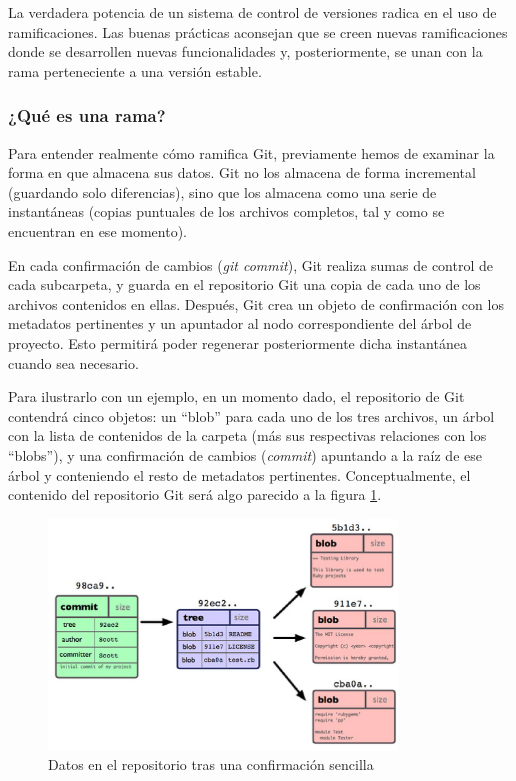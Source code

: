 La verdadera potencia de un sistema de control de versiones radica en el uso de ramificaciones. Las buenas prácticas aconsejan que se creen nuevas ramificaciones donde se desarrollen nuevas funcionalidades y, posteriormente, se unan con la rama perteneciente a una versión estable. 

\subsubsection{¿Qué es una rama? \label{que_es_rama}}

Para entender realmente cómo ramifica Git, previamente hemos de examinar la forma en que almacena sus datos. Git no los almacena de forma incremental (guardando solo diferencias), sino que los almacena como una serie de instantáneas (copias puntuales de los archivos completos, tal y como se encuentran en ese momento).

En cada confirmación de cambios ({\it git commit}), Git realiza sumas de control de cada subcarpeta, y guarda en el repositorio Git una copia de cada uno de los archivos contenidos en ellas. Después, Git crea un objeto de confirmación con los metadatos pertinentes y un apuntador al nodo correspondiente del árbol de proyecto. Esto permitirá poder regenerar posteriormente dicha instantánea cuando sea necesario. 

Para ilustrarlo con un ejemplo, en un momento dado, el repositorio de Git contendrá cinco objetos: un ``blob'' para cada uno de los tres archivos, un árbol con la lista de contenidos de la carpeta (más sus respectivas relaciones con los ``blobs''), y una confirmación de cambios ({\it commit}) apuntando a la raíz de ese árbol y conteniendo el resto de metadatos pertinentes. Conceptualmente, el contenido del repositorio Git será algo parecido a la figura \ref{fig:ramas_conf_senc}.

\begin{figure}
  \centering
    \includegraphics[width=350px]{./eps/git/git_datos_repositorio_confirmacion_sencilla.eps}
  \caption{Datos en el repositorio tras una confirmación sencilla}
  \label{fig:ramas_conf_senc}
\end{figure}

